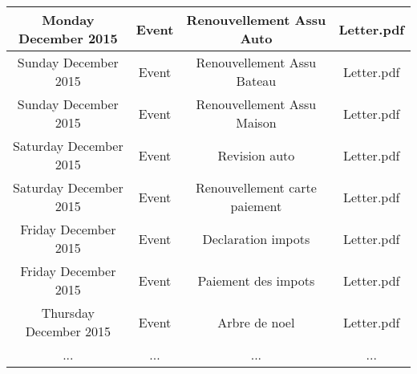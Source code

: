 \begin{longtable}{|c|c|c|c|}
\hline
Monday December 2015 & Event & Renouvellement Assu Auto & Letter.pdf\\
\hline
Sunday December 2015 & Event & Renouvellement Assu Bateau & Letter.pdf\\
\hline
Sunday December 2015 & Event & Renouvellement Assu Maison & Letter.pdf\\
\hline
Saturday December 2015 & Event & Revision auto & Letter.pdf\\
\hline
Saturday December 2015 & Event & Renouvellement carte paiement & Letter.pdf\\
\hline
Friday December 2015 & Event & Declaration impots & Letter.pdf\\
\hline
Friday December 2015 & Event & Paiement des impots & Letter.pdf\\
\hline
Thursday December 2015 & Event & Arbre de noel & Letter.pdf\\
\hline
 ... & ... & ... & ... \\
\hline
\hline
\end{longtable}
